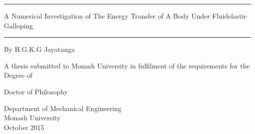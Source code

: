 \documentclass[11pt,titlepage,twoside,a4paper]{report}
\newcommand{\myclearpage}{\thispagestyle{empty}\cleartoevenpage\thispagestyle{empty}\cleartooddpage}
\begin{document}
\begin{titlepage}
\noindent\rule{\textwidth}{1.5pt}
\begin{flushright}
\LARGE
{\sc A Numerical Investigation of The Energy Transfer of A Body Under Fluidelastic Galloping} \\

\noindent\rule{\textwidth}{1.5pt}

\LARGE
\vspace{30mm}
{\sc By H.G.K.G Jayatunga}
\vspace{30mm}

\normalsize
{\sc A thesis submitted to Monash University in fulfilment of the requirements for the Degree of}

\vspace{5mm}
\LARGE
{\sc Doctor of Philosophy}

\vspace{15mm}
\normalsize
Department of Mechanical Engineering\\
Monash University\\
October 2015
\end{flushright}

\end{titlepage}

\myclearpage

%
%
%
%	


%
%

\tableofcontents
{}
%
%


%

%




\end{document}
